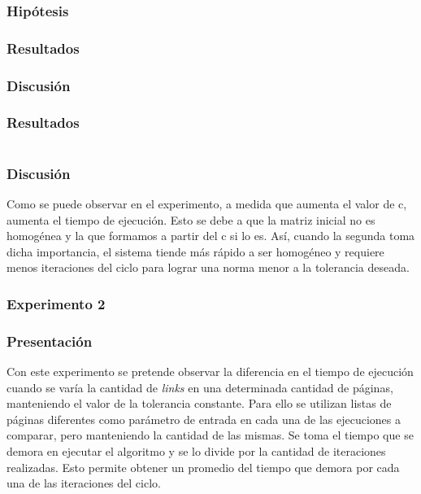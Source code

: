             \subsubsection*{Hipótesis}

            \subsubsection*{Resultados}

            \subsubsection*{Discusión}



			\subsubsection*{Resultados}
				{\centering \begin{tabular}{c}
			    \end{tabular}}

			\subsubsection*{Discusión} 
			Como se puede observar en el experimento, a medida que aumenta el valor de c, aumenta el tiempo de ejecución. Esto se debe a que la matriz inicial no es homogénea y la que formamos a partir del c si lo es. Así, cuando la segunda toma dicha importancia, el sistema tiende más rápido a ser homogéneo y requiere menos iteraciones del ciclo para lograr una norma menor a la tolerancia deseada. 


		\subsubsection{Experimento 2}
			\subsubsection*{Presentación}
			Con este experimento se pretende observar la diferencia en el tiempo de ejecución cuando se varía la cantidad de \emph{links} en una determinada cantidad de páginas, manteniendo el valor de la tolerancia constante.
			Para ello se utilizan listas de páginas diferentes como parámetro de entrada en cada una de las ejecuciones a comparar, pero manteniendo la cantidad de las mismas. Se toma el tiempo que se demora en ejecutar el algoritmo y se lo divide por la cantidad de iteraciones realizadas. Esto permite obtener un promedio del tiempo que demora por cada una de las iteraciones del ciclo.
		
